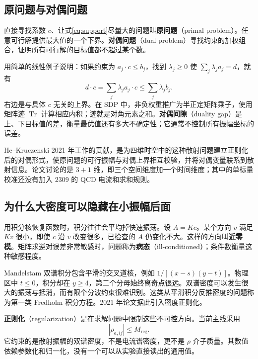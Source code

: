 \documentclass[UTF8,a4paper,11pt,fontset=fandol]{ctexart}
\numberwithin{equation}{section}
\newcommand{\Tr}{\operatorname{Tr}}
\newcommand{\Mreg}{M_{\mathrm{reg}}}
\begin{document}
\subsection{原问题与对偶问题}
直接寻找系数 \(c\)、让式\eqref{eq:support}尽量大的问题叫\textbf{原问题}（primal problem）。任意可行解提供最大值的一个下界。\textbf{对偶问题}（dual problem）寻找约束的加权组合，证明所有可行解的目标值都不超过某个数。

用简单的线性例子说明：如果约束为 \(a_j\cdot c\le b_j\)，找到 \(\lambda_j\ge0\) 使 \(\sum_j\lambda_j a_j=d\)，就有
\begin{equation}\label{eq:dualexample}
d\cdot c=\sum_j\lambda_j a_j\cdot c\le\sum_j\lambda_j b_j.
\end{equation}
右边是与具体 \(c\) 无关的上界。在 SDP 中，非负权重推广为半正定矩阵乘子，使用矩阵迹 \(\Tr\) 计算相应内积；迹就是对角元素之和。\textbf{对偶间隙}（duality gap）是上、下目标值的差，衡量最优值还有多大不确定性；它通常不控制所有振幅坐标的误差。

He--Kruczenski 2021 年工作的贡献，是为四维时空中的这种散射问题建立正则化后的对偶形式，使原问题的可行振幅与对偶上界相互校验，并将对偶变量联系到散射信息。论文讨论的是 \(3+1\) 维，即三个空间维度加一个时间维度；其中的单标量校准还没有加入 2309 的 QCD 电流和求和规则。\cite{hk21}

\subsection{为什么大密度可以隐藏在小振幅后面}
用积分核恢复函数时，积分往往会平均掉快速振荡。设 \(A=Kc\)。某个方向 \(v\) 满足 \(Kv\) 很小，即使 \(c\) 沿 \(v\) 改变很多，已检查的 \(A\) 仍变化不大。这样的方向叫\textbf{近零模}。矩阵求逆对误差非常敏感时，问题称为\textbf{病态}（ill-conditioned）；条件数衡量这种敏感程度。

Mandelstam 双谱积分包含平滑的交叉道核，例如 \(1/[(x-s)(y-t)]\)。物理区中 \(t\le0\)，积分却在 \(y\ge4\)，第二个分母始终离奇点很远。双谱密度可以发生很大的振荡与抵消，而有限个分波约束很难识别。这类从平滑积分反推密度的问题称为第一类 Fredholm 积分方程。2021 年论文据此引入密度正则化。\cite{hk21}

\textbf{正则化}（regularization）是在求解问题中限制这些不可控方向。当前主线采用
\begin{equation}\label{eq:reg}
|\rho_{a,ij}|\le\Mreg.
\end{equation}
它约束的是散射振幅的双谱密度，不是电流谱密度，更不是 \(\rho\) 介子质量。其数值依赖参数化和归一化，没有一个可以从实验直接读出的通用值。
\end{document}
